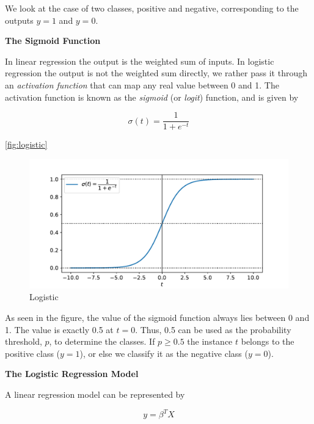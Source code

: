 We look at the case of two classes, positive and negative, corresponding to the outputs $y=1$ and $y=0$.

\textbf{The Sigmoid Function}

In linear regression the output is the weighted sum of inputs. In logistic regression the output is not the weighted sum directly, we rather pass it through an \textit{activation function} that can map any real value between 0 and 1. The activation function is known as the \textit{sigmoid} (or \textit{logit}) function, and is given by

\begin{equation}\label{eq:sigmoid_func}
    \sigma (t) = \frac{1}{1+ e^{-t}}
\end{equation}

\autoref{fig:logistic}

\begin{figure}[H]
\begin{center}\includegraphics[scale=0.6]{latex/figures/logistic_function.pdf}
\end{center}
\caption{Logistic}
\label{fig:logistic}
\end{figure}

As seen in the figure, the value of the sigmoid function always lies between 0 and 1. The value is exactly 0.5 at $t=0$. Thus, 0.5 can be used as the probability threshold, $p$, to determine the classes. If $p \geq 0.5$ the instance $t$ belongs to the positive class ($y = 1$), or else we classify it as the negative class ($y = 0$).

\textbf{The Logistic Regression Model}

A linear regression model can be represented by

\begin{equation}
    y = \beta^T X
\end{equation}

